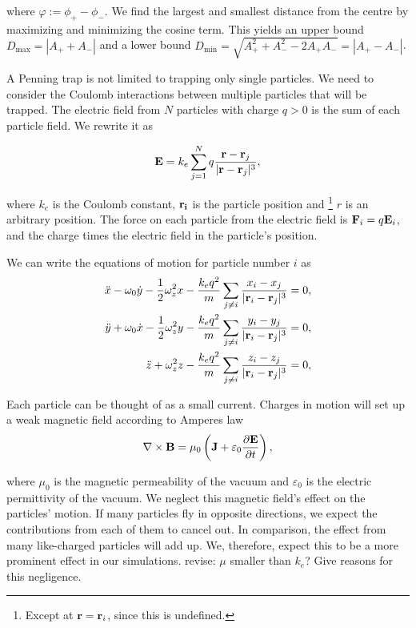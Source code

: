 where $\varphi := \phi_+ - \phi_-.$
We find the largest and smallest distance from the centre by maximizing and minimizing the
cosine term. This yields an upper bound $D_{\text{max}} = |A_{+} + A_{-}|$ and a lower bound
$D_{\text{min}} =  \sqrt{A_+^2 + A_-^2 - 2A_+A_-} = |A_+ - A_-|$.

A Penning trap is not limited to trapping only single particles. We need to
consider the Coulomb interactions between multiple particles that will be trapped. The electric field from $N$
particles with charge $q>0$ is the sum of each particle field. We rewrite it as

\begin{equation}
\bold{E} = k_e\sum_{j=1}^Nq\frac{\bold{r} - \bold{r}_j}{|\bold{r} - \bold{r}_j|^3},
\end{equation}

where $k_e$ is the Coulomb constant, $\bold{r_i}$ is the particle position and
\footnote{Except at $\bold{r} = \bold{r}_i$, since this is undefined.}
$r$ is an arbitrary position. The force on each particle from the electric field is $\bold{F}_i = q\bold{E}_i$,
and the charge times the electric field in the particle's position.

We can write the equations of motion for particle number $i$ as 
\begin{align}
  \ddot{x} - \omega_{0}\dot{y} - \frac{1}{2}\omega_{z}^{2}x -\frac{k_eq^2}{m}\sum_{j\neq i}
  \frac{x_i - x_j}{|\bold{r}_i - \bold{r}_j|^3} &= 0, \label{eq:eom_inter_x}\\
  \ddot{y} + \omega_{0}\dot{x} - \frac{1}{2}\omega_{z}^{2}y - \frac{k_eq^2}{m}\sum_{j\neq i}
\frac{y_i - y_j}{|\bold{r}_i - \bold{r}_j|^3}
&= 0, \label{eq:eom_inter_y}\\
  \ddot{z} + \omega_{z}^{2}z -\frac{k_eq^2}{m}\sum_{j\neq i}
  \frac{z_i - z_j}{|\bold{r}_i - \bold{r}_j|^3} &= 0, \label{eq:eom_inter_z}
\end{align}

Each particle can be thought of as a small current. Charges in motion will set up a weak magnetic field
according to Amperes law
\begin{equation}
\nabla \times \bold{B} = \mu_0 \left(\bold{J} + \varepsilon_0 \frac{\partial \bold{E}}{\partial t}\right),
\end{equation}

where $\mu_0$ is the magnetic permeability of the vacuum and $\varepsilon_0$ is the electric permittivity of
the vacuum. We neglect this magnetic field's effect on the particles' motion. If many particles
fly in opposite directions, we expect the contributions from each of them to cancel out.
In comparison, the effect from many like-charged particles will add up. We, therefore, expect this
to be a more prominent effect in our simulations.
revise: $\mu$
smaller than $k_e$? Give reasons for this negligence.
